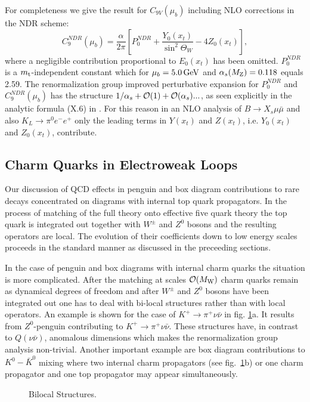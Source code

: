 \documentclass[12pt,rotate]{article}
\def\as{\alpha_s}
\newcommand{\mt}{m_{\rm t}}
\newcommand{\mw}{M_{\rm W}}
\newcommand{\mz}{M_{\rm Z}}
\newcommand{\gev}{\, {\rm GeV}}
\newcommand{\aem}{\alpha}
\newcommand{\ord}{{\cal O}}
\def\kpn{K^+\rightarrow\pi^+\nu\bar\nu}
\begin{document}
\begin{itemize}
\begin{itemize}
For completeness we give the result for $C_{9V}(\mu_b)$ including
NLO corrections in the NDR scheme:
\begin{equation}\label{C9tilde}
C_9^{NDR}(\mu_b)  = \frac{\aem}{2\pi}\left[  
P_0^{NDR} + \frac{Y_0(x_t)}{\sin^2\Theta_W} -4 Z_0(x_t)\right],
\end{equation}
where a negligible contribution proportional to $E_0(x_t)$ has been 
omitted.
$P_0^{NDR}$ is a $\mt$-independent constant which for $\mu_b=5.0 \gev$
and $\as(\mz)=0.118$ equals 2.59. 
The renormalization group improved perturbative expansion for
$P_0^{NDR}$ and $C_9^{NDR}(\mu_b)$ has the structure
$1/\as+\ord(1)+\ord(\as)...$, as seen explicitly in the analytic
formula (X.6) in \cite{BBL}. For this reason in an NLO analysis of
$B\to X_s\mu\bar\mu$ and also $K_L \to\pi^0 e^-e^+$ 
only the leading terms in $Y(x_t)$ and $Z(x_t)$,
i.e. $Y_0(x_t)$ and $Z_0(x_t)$, contribute. 
\subsection{Charm Quarks in Electroweak Loops}
Our discussion of QCD effects in penguin and box diagram contributions
to rare decays concentrated on diagrams with internal top quark
propagators. In the process of matching of the full theory onto
effective five quark theory the top quark is integrated out together
with $W^\pm$ and $Z^0$ bosons and the resulting operators 
are local. The
evolution of their coefficients down to low energy scales proceeds
in the standard manner as discussed in the preceeding sections.

In the case of penguin and box diagrams with internal charm quarks
the situation is more complicated. After the matching at scales
$\ord(\mw)$ charm quarks remain as dynamical degrees of freedom
and after $W^\pm$ and $Z^0$ bosons have been integrated out one has to
deal with bi-local structures rather than with local operators.
An example is shown for the case of $\kpn$ in fig. \ref{L:11}a. 
It results from $Z^0$-penguin contributing to $K^+\to\pi^+\nu\bar\nu$.
These
structures have, in contrast to $Q(\nu\bar\nu)$, anomalous
dimensions which makes the renormalization group analysis
non-trivial. 
Another important example are box diagram contributions to
$K^0-\bar K^0$ mixing where two internal charm propagators 
(see fig.~\ref{L:11}b) or
one charm propagator and one top propagator may appear simultaneously.

\begin{figure}[hbt]
\vspace{0.10in}
\centerline{
\epsfysize=2in
}%
\vspace{0.08in}
\caption[]{Bilocal Structures. 
\label{L:11}}
\end{figure}


\end{itemize}
\end{itemize}
\end{document}
